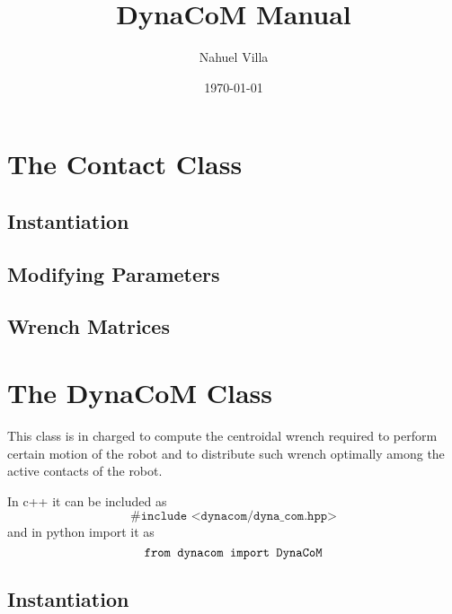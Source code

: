 \documentclass[12pt]{article}
\title{DynaCoM Manual}
\author{Nahuel Villa}
\date{\today}
\begin{document}
\maketitle{}

\tableofcontents

\clearpage
\newpage

\section{The Contact Class}

\subsection{Instantiation}
\hrulefill



\clearpage

\subsection{Modifying Parameters}
\hrulefill



\clearpage

\subsection{Wrench Matrices}
\hrulefill




\clearpage

\section{The DynaCoM Class}

    This class is in charged to compute the centroidal wrench required to perform certain motion of the robot and to distribute such wrench optimally among the active contacts of the robot.

    In c++ it can be included as
    \begin{equation*}
    \texttt{\#include <dynacom/dyna\_com.hpp>}
    \end{equation*}
    and in python import it as
    \begin{equation*}
    \texttt{\texttt{from dynacom import DynaCoM}}
    \end{equation*}

\subsection{Instantiation}
\hrulefill
\end{document}
